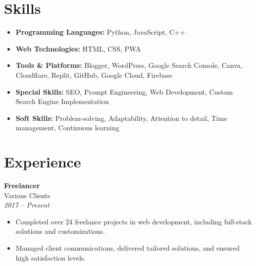 \documentclass[a4paper,10pt]{article}
\begin{document}
\section*{Skills}
\begin{multicols}{2}
    \begin{itemize}[label=--]
        \item \textbf{Programming Languages:} Python, JavaScript, C++
        \item \textbf{Web Technologies:} HTML, CSS, PWA
        \item \textbf{Tools \& Platforms:} Blogger, WordPress, Google Search Console, Canva, Cloudflare, Replit, GitHub, Google Cloud, Firebase
        \item \textbf{Special Skills:} SEO, Prompt Engineering, Web Development, Custom Search Engine Implementation
        \item \textbf{Soft Skills:} Problem-solving, Adaptability, Attention to detail, Time management, Continuous learning
    \end{itemize}
\end{multicols}

\section*{Experience}
\textbf{Freelancer} \\
Various Clients \\
\textit{2017 -- Present}
\begin{itemize}[label=--]
    \item Completed over 24 freelance projects in web development, including full-stack solutions and customizations.
    \item Managed client communications, delivered tailored solutions, and ensured high satisfaction levels.
\end{itemize}
\end{document}
